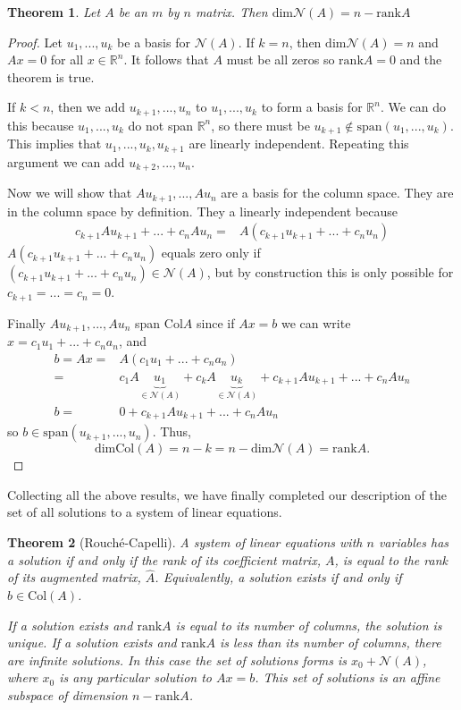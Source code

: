 \documentclass[12pt,reqno]{amsart}
\newtheorem{theorem}{Theorem}[section]
\theoremstyle{definition}
\def\R{\mathbb{R}}
\newcommand{\rank}{\mathrm{rank}}
\newcommand{\spn}{\mathrm{span}}
\newcommand{\col}{\mathrm{Col}}
\renewcommand{\dim}{\mathrm{dim}}
\begin{document}
\begin{theorem}
  Let $A$ be an $m$ by $n$ matrix. Then 
  $\dim \mathcal{N}(A) = n - \rank A$
\end{theorem}
\begin{proof}
  Let $u_1, ..., u_k$ be a basis for $\mathcal{N}(A)$. If $k=n$, then
  $\dim \mathcal{N}(A) = n$ and $A x = 0$ for all $x \in \R^n$. It
  follows that $A$ must be all zeros so $\rank A = 0$ and the theorem
  is true. 

  If $k < n$, then we add $u_{k+1},...,u_n$ to $u_1, ..., u_k$ to form
  a basis for $\R^n$. We can do this because $u_1, ..., u_k$
  do not span $\R^n$, so there must be $u_{k+1} \not\in \spn(u_1, ...,
  u_k)$. This implies that $u_1, ..., u_k, u_{k+1}$ are linearly
  independent. Repeating this argument we can add $u_{k+2}, ...,
  u_n$. 

  Now we will show that  $A u_{k+1}, ..., A u_n$ are a basis for the
  column space. They are in the column space by definition. They a
  linearly independent because
  \begin{align*}
    c_{k+1} A u_{k+1} + ... + c_n A u_{n} = & A (c_{k+1} u_{k+1} +
    ... + c_n u_{n}) 
  \end{align*}
  $A (c_{k+1} u_{k+1} + ... + c_n u_{n})$ equals zero only if $ (c_{k+1} u_{k+1} +
  ... + c_n u_{n}) \in \mathcal{N}(A)$, but by construction this is
  only possible for $c_{k+1} =  ... = c_n = 0$.  

  Finally $A u_{k+1}, ..., A u_n$ span $\col A$ since if $A x = b$ we
  can write $x = c_1 u_1 + ... + c_n a _n$, and
  \begin{align*}
    b = A x = & A \left( c_1 u_1 + ... + c_n a_n \right) \\
    = & c_1 A \underbrace{u_1}_{\in \mathcal{N}(A)} + c_k A
    \underbrace{u_k}_{\in \mathcal{N}(A)} + 
    c_{k+1}Au_{k+1} + ... +c_n A u_n \\
    b = & 0  +     c_{k+1}Au_{k+1} + ... +c_n A u_n 
  \end{align*}
  so $b \in \spn (u_{k+1}, ..., u_n )$. Thus, 
  \[ \dim \col(A) = n-k = n - \dim \mathcal{N}(A) = \rank A. \]
\end{proof}

Collecting all the above results, we have finally completed our
description of the set of all solutions to a system of linear
equations. 
\begin{theorem}[Rouch\'{e}-Capelli] \label{thm:rc} A system of linear
  equations with $n$ variables has a solution if and only if the rank
  of its coefficient matrix, $A$, is equal to the rank of its
  augmented matrix, $\hat{A}$. Equivalently, a solution exists if and
  only if $b \in \col(A)$.

  If a solution exists and $\rank A$ is equal to its number of
  columns, the solution is unique. If a solution exists and $\rank A$
  is less than its number of columns, there are infinite solutions. In
  this case the set of solutions forms is $x_0 + \mathcal{N}(A)$,
  where $x_0$ is any particular solution to $A x = b$. This set of
  solutions is an affine subspace of dimension $n - \rank A$.
\end{theorem}
\end{document}
